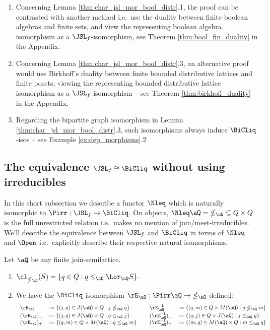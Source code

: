 \documentclass{article}
\begin{document}
\begin{note}
\item
\begin{enumerate}
\item
Concerning Lemma \ref{thm:char_jsl_mor_bool_distr}.1, the proof can be contrasted with another method i.e.\ use the duality between finite boolean algebras and finite sets, and view the representing boolean algebra isomorphism as a $\JSL_f$-isomorphism, see Theorem \ref{thm:bool_fin_duality} in the Appendix.


\item
Concerning Lemma \ref{thm:char_jsl_mor_bool_distr}.3, an alternative proof would use Birkhoff's duality between finite bounded distributive lattices and finite posets, viewing the representing bounded distributive lattice isomorphism as a $\JSL_f$-isomorphism -- see Theorem \ref{thm:birkhoff_duality} in the Appendix.

\item
Regarding the bipartite graph isomorphism in Lemma \ref{thm:char_jsl_mor_bool_distr}.3, such isomorphisms always induce $\BiCliq$-isos -- see Example \ref{ex:dep_morphisms}.2 \endbox

\end{enumerate}
\end{note}


\subsection{The equivalence $\JSL_f \cong \BiCliq$ without using irreducibles}

In this short subsection we describe a functor $\Nleq$ which is naturally isomorphic to $\Pirr : \JSL_f \to \BiCliq$. On objects, $\Nleq \aQ = \; \nleq_\aQ \; \subseteq Q \times Q$ is the full unrestricted relation i.e.\ makes no mention of join/meet-irreducibles. We'll describe the equivalence between $\JSL_f$ and $\BiCliq$ in terms of $\Nleq$ and $\Open$ i.e.\ explicitly describe their respective natural isomorphisms.

\begin{lemma}
\label{lem:pirr_to_nleq_iso}
Let $\aQ$ be any finite join-semilattice.
\begin{enumerate}
\item
$\cl_{\nleq_\aQ}(S) = \{ q \in Q : q \leq_\aQ \Lor_\aQ S \}$.

\item
We have the $\BiCliq$-isomorphism $\rE_\aQ : \Pirr\aQ \to \; \nleq_\aQ$ defined:
\[
\begin{tabular}{lllll}
$\rE_\aQ$ & $:= \{ (j,q) \in J(\aQ) \times Q : j \nleq_\aQ q \}$
&&
$\rE_\aQ^{\bf-1}$ & $:= \{ (q,m) \in Q \times M(\aQ) : q \nleq_\aQ m \}$
\\[0.5ex]
$(\rE_\aQ)_-$ & $:= \{ (j,q) \in J(\aQ) \times Q : q \leq_\aQ j \}$
&&
$(\rE_\aQ^{\bf-1})_-$ & $:= \{ (q,j) \in Q \times J(\aQ) : j \leq_\aQ q \}$
\\
$(\rE_\aQ)_+$ & $:= \{ (q,m) \in Q \times M(\aQ) : q \leq_\aQ m \}$
&&
$(\rE_\aQ^{\bf-1})_+$ & $:= \{ (m,q) \in M(\aQ) \times Q : m \leq_\aQ q \}$
\end{tabular}
\]
\end{enumerate}
\end{lemma}
\end{document}
